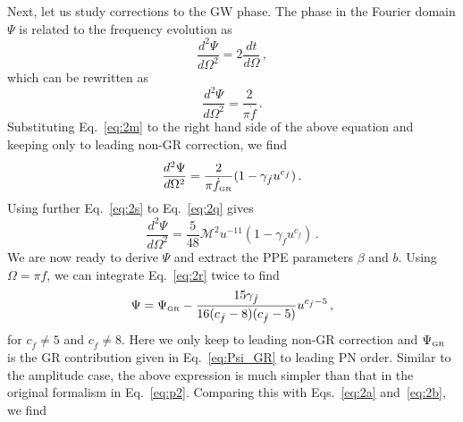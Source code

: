 \documentclass[prd,twocolumn,nofootinbib]{revtex4-1}
\newcommand\be{\begin{equation}}
\newcommand\ee{\end{equation}}
\newcommand{\GR}{{\mbox{\tiny GR}}}
\begin{document}
Next, let us study corrections to the GW phase. The phase in the Fourier domain $\Psi$ is related to the frequency evolution as~\cite{Tichy:1999pv}
\begin{equation}
\frac{d^2\Psi}{d \Omega^2}=2\frac{d t}{d\Omega}\,,
\end{equation}
which can be rewritten as
\begin{equation}
\frac{d^2\Psi}{d \Omega^2}=\frac{2}{\pi \dot{f}}\,.
\end{equation}
Substituting Eq.~\eqref{eq:2m} to the right hand side of the above equation and keeping only to leading non-GR correction, we find 
\begin{equation}\label{eq:2q}
\frac{d^2\Psi}{d \Omega^2}=\frac{2}{\pi\dot{f}_{\GR}}(1-\gamma_{\dot{f}}u^{c_{\dot{f}}})\,.
\end{equation}
Using further Eq.~\eqref{eq:2s} to Eq.~\eqref{eq:2q} gives
\begin{equation}\label{eq:2r}
\frac{d^2\Psi}{d \Omega^2}=\frac{5}{48}\mathcal{M}^2u^{-11}(1-\gamma_{\dot{f}}u^{c_{\dot{f}}})\,.
\end{equation}
We are now ready to derive $\Psi$ and extract the PPE parameters $\beta$ and $b$. Using $\Omega = \pi f$, we can integrate Eq.~\eqref{eq:2r} twice to find 
\be
\label{eq:Psi}
\Psi = \Psi_\GR  -\frac{15 \text{$\gamma_{\dot{f}} $}}{16 (\text{$c_{\dot{f}}$}-8) (\text{$c_{\dot{f}}$}-5)} u^{c_{\dot{f}}-5}\,,
\ee
for $c_{\dot{f}} \neq 5$ and $c_{\dot{f}} \neq 8$. Here we only keep to leading non-GR correction and $\Psi_{\GR}$ is the GR contribution given in Eq.~\eqref{eq:Psi_GR} to leading PN order. Similar to the amplitude case, the above expression is much simpler than that in the original formalism in Eq.~\eqref{eq:p2}.
Comparing this with Eqs.~\eqref{eq:2a} and~\eqref{eq:2b}, we find
\end{document}
